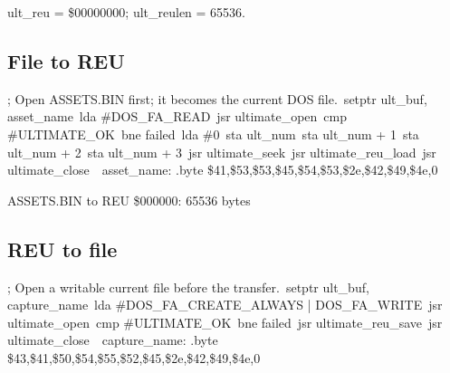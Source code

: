 \begin{resultbox}
ult_reu = \$00000000; ult_reulen = 65536.
\end{resultbox}

\subsection*{File to REU}

\begin{listingbox}
\hspace*{2em}; Open ASSETS.BIN first; it becomes the current DOS file.\
\hspace*{2em}setptr ult\_buf, asset\_name\
\hspace*{2em}lda \#DOS\_FA\_READ\
\hspace*{2em}jsr ultimate\_open\
\hspace*{2em}cmp \#ULTIMATE\_OK\
\hspace*{2em}bne failed\
\hspace*{2em}lda \#0\
\hspace*{2em}sta ult\_num\
\hspace*{2em}sta ult\_num + 1\
\hspace*{2em}sta ult\_num + 2\
\hspace*{2em}sta ult\_num + 3\
\hspace*{2em}jsr ultimate\_seek\
\hspace*{2em}jsr ultimate\_reu\_load\
\hspace*{2em}jsr ultimate\_close\
\
asset\_name: .byte \$41,\$53,\$53,\$45,\$54,\$53,\$2e,\$42,\$49,\$4e,0
\end{listingbox}

\begin{resultbox}
ASSETS.BIN to REU \$000000: 65536 bytes
\end{resultbox}

\Needspace{18\baselineskip}
\subsection*{REU to file}

\begin{listingbox}
\hspace*{2em}; Open a writable current file before the transfer.\
\hspace*{2em}setptr ult\_buf, capture\_name\
\hspace*{2em}lda \#DOS\_FA\_CREATE\_ALWAYS | DOS\_FA\_WRITE\
\hspace*{2em}jsr ultimate\_open\
\hspace*{2em}cmp \#ULTIMATE\_OK\
\hspace*{2em}bne failed\
\hspace*{2em}jsr ultimate\_reu\_save\
\hspace*{2em}jsr ultimate\_close\
\
capture\_name: .byte \$43,\$41,\$50,\$54,\$55,\$52,\$45,\$2e,\$42,\$49,\$4e,0
\end{listingbox}

